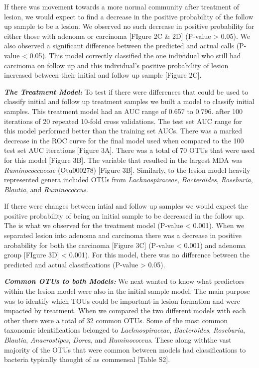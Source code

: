 \documentclass[12pt,]{article}
\begin{document}
If there was movement towards a more normal community after treatment of
lesion, we would expect to find a decrease in the positive probability
of the follow up sample to be a lesion. We observed no such decrease in
positive probability for either those with adenoma or carcinoma
{[}FIgure 2C \& 2D{]} (P-value \textgreater{} 0.05). We also observed a
significant difference between the predicted and actual calls (P-value
\textless{} 0.05). This model correctly classified the one individual
who still had carcinoma on follow up and this individual's positive
probability of lesion increased between their initial and follow up
sample {[}Figure 2C{]}.

\textbf{\emph{The Treatment Model:}} To test if there were differences
that could be used to classify initial and follow up treatment samples
we built a model to classify initial samples. This treatment model had
an AUC range of 0.657 to 0.796. after 100 iterations of 20 repeated
10-fold cross validations. The test set AUC range for this model
performed better than the training set AUCs. There was a marked decrease
in the ROC curve for the final model used when compared to the 100 test
set AUC iterations {[}Figure 3A{]}. There was a total of 70 OTUs that
were used for this model {[}Figure 3B{]}. The variable that resulted in
the largest MDA was \emph{Ruminococcaceae} (Otu000278) {[}Figure 3B{]}.
Similarly, to the lesion model heavily represented genera included OTUs
from \emph{Lachnospiraceae}, \emph{Bacteroides}, \emph{Roseburia},
\emph{Blautia}, and \emph{Ruminococcus}.

If there were changes between intial and follow up samples we would
expect the positive probability of being an initial sample to be
decreased in the follow up. The is what we observed for the treatment
model (P-value \textless{} 0.001). When we separated lesion into adenoma
and carcinoma there was a decrease in positive arobability for both the
carcinoma {[}Figure 3C{]} (P-value \textless{} 0.001) and adenoma group
{[}FIgure 3D{]} \textless{} 0.001). For this model, there was no
difference between the predicted and actual classifications (P-value
\textgreater{} 0.05).

\textbf{\emph{Common OTUs to both Models:}} We next wanted to know what
predictors within the lesion model were also in the initial sample
model. The main purpose was to identify which TOUs could be important in
lesion formation and were impacted by treatment. When we compared the
two different models with each other there were a total of 32 common
OTUs. Some of the most common taxonomic identifications belonged to
\emph{Lachnospiraceae}, \emph{Bacteroides}, \emph{Roseburia},
\emph{Blautia}, \emph{Anaerostipes}, \emph{Dorea}, and
\emph{Ruminococcus}. These along withthe vast majority of the OTUs that
were common between models had classifications to bacteria typically
thought of as commensal {[}Table S2{]}.
\end{document}
